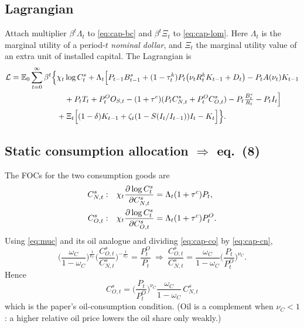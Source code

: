 \subsection{Lagrangian}
Attach multiplier $\beta^t\Lambda_t$ to \eqref{eq:cap-bc} and $\beta^t\Xi_t$ to \eqref{eq:cap-lom}.
Here $\Lambda_t$ is the marginal utility of a period-$t$ \emph{nominal dollar}, and $\Xi_t$ the
marginal utility value of an extra unit of installed capital. The Lagrangian is
\begin{align}
\mathcal L=\mathbb{E}_0\sum_{t=0}^\infty \beta^t\Big\{&\chi_t\log C^s_t
+\Lambda_t\Big[P_{t-1}B^s_{t-1}+(1-\tau^k_t)P_t\big(\nu_t R^k_t K_{t-1}+D_t\big)-P_tA(\nu_t)K_{t-1}\nonumber\\
&\quad+P_tT_t+P^O_tO_{S,t}-(1+\tau^c)(P_tC^s_{N,t}+P^O_tC^s_{O,t})-P_t\tfrac{B^s_t}{R_t}-P_tI_t\Big]\nonumber\\
&+\Xi_t\Big[(1-\delta)K_{t-1}+\zeta_t(1-S(I_t/I_{t-1}))I_t-K_t\Big]\Big\}.\label{eq:cap-lag}
\end{align}

\subsection{Static consumption allocation \texorpdfstring{$\Rightarrow$}{=>} eq.\ (8)}
The FOCs for the two consumption goods are
\begin{align}
C^s_{N,t}:&\quad \chi_t\frac{\partial \log C^s_t}{\partial C^s_{N,t}}=\Lambda_t(1+\tau^c)P_t,\label{eq:cap-cn}\\
C^s_{O,t}:&\quad \chi_t\frac{\partial \log C^s_t}{\partial C^s_{O,t}}=\Lambda_t(1+\tau^c)P^O_t.\label{eq:cap-co}
\end{align}
Using \eqref{eq:muc} and its oil analogue and dividing \eqref{eq:cap-co} by \eqref{eq:cap-cn},
\[
\Big(\frac{\omega_C}{1-\omega_C}\Big)^{\frac1{\nu_C}}\Big(\frac{C^s_{O,t}}{C^s_{N,t}}\Big)^{-\frac1{\nu_C}}
=\frac{P^O_t}{P_t}
\ \Longrightarrow\
\frac{C^s_{O,t}}{C^s_{N,t}}=\frac{\omega_C}{1-\omega_C}\Big(\frac{P_t}{P^O_t}\Big)^{\nu_C}.
\]
Hence
\begin{equation}\label{eq:8}
\boxed{\,C^s_{O,t}=\Big(\frac{P_t}{P^O_t}\Big)^{\nu_C}\frac{\omega_C}{1-\omega_C}\,C^s_{N,t}\,}
\tag{P-8}
\end{equation}
which is the paper's oil-consumption condition. (Oil is a complement when $\nu_C<1$: a higher
relative oil price lowers the oil share only weakly.)

